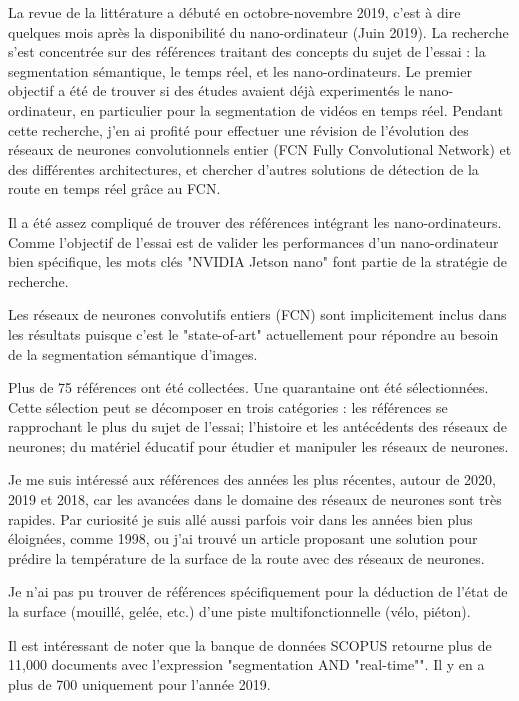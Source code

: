\par La revue de la littérature  a débuté en octobre-novembre 2019, c'est à dire quelques mois après la disponibilité du nano-ordinateur (Juin 2019). La recherche s'est concentrée sur des références traitant des concepts du sujet de l'essai : la segmentation sémantique, le temps réel, et les nano-ordinateurs. Le premier objectif a été de trouver si des études avaient déjà experimentés le nano-ordinateur, en particulier pour la segmentation de vidéos en temps réel. Pendant cette recherche, j'en ai profité pour effectuer une révision de l'évolution des réseaux de neurones convolutionnels entier (FCN Fully Convolutional Network)  et des différentes architectures, et chercher d'autres solutions de détection de la route en temps réel grâce au FCN. 
\par Il a été assez compliqué de trouver des références intégrant les nano-ordinateurs. Comme l'objectif de l'essai est de valider les performances d'un nano-ordinateur bien spécifique, les mots clés "NVIDIA Jetson nano" font partie de la stratégie de recherche. 
\par Les réseaux de neurones convolutifs entiers (FCN) sont implicitement inclus dans les résultats puisque c'est le "state-of-art" actuellement pour répondre au besoin de la segmentation sémantique d'images.
\par Plus de 75 références ont été collectées. Une quarantaine ont été sélectionnées. Cette sélection peut se décomposer en trois catégories : les références se rapprochant le plus du sujet de l'essai; l'histoire et les antécédents des réseaux de neurones; du matériel éducatif pour étudier et manipuler les réseaux de neurones.
\par Je me suis intéressé aux références des années les plus récentes, autour de 2020, 2019 et 2018, car les avancées dans le domaine des réseaux de neurones sont très rapides. Par curiosité je suis allé aussi parfois voir dans les années bien plus éloignées, comme 1998, ou j'ai trouvé un article proposant une solution pour prédire la température de la surface de la route avec des réseaux de neurones.
\par Je n'ai pas pu trouver de références spécifiquement pour la déduction de l'état de la surface (mouillé, gelée, etc.) d'une piste multifonctionnelle (vélo, piéton). 
\par Il est intéressant de noter que la banque de données SCOPUS retourne plus de 11,000 documents avec l'expression "segmentation AND "real-time"". Il y en a plus de 700 uniquement pour l'année 2019. 